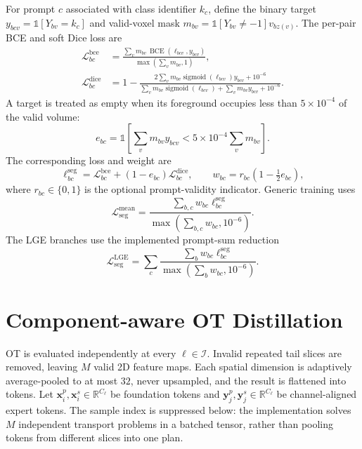 \documentclass[10pt]{article}
\newcommand{\R}{\mathbb{R}}
\newcommand{\one}{\mathbb{1}}
\newcommand{\cL}{\mathcal{L}}
\newcommand{\BCE}{\operatorname{BCE}}
\newcommand{\sigm}{\operatorname{sigmoid}}
\begin{document}
For prompt $c$ associated with class identifier $k_c$, define the binary target
$y_{bcv}=\one[Y_{bv}=k_c]$ and valid-voxel mask
$m_{bv}=\one[Y_{bv}\neq-1]v_{bz(v)}$.  The per-pair BCE and soft Dice loss are
\begin{align}
    \cL^{\mathrm{bce}}_{bc}
    &=\frac{\sum_v m_{bv}\,
       \BCE(\ell_{bcv},y_{bcv})}
       {\max(\sum_v m_{bv},1)},\\
    \cL^{\mathrm{dice}}_{bc}
    &=1-\frac{
       2\sum_v m_{bv}\sigm(\ell_{bcv})y_{bcv}+10^{-6}}
       {\sum_v m_{bv}\sigm(\ell_{bcv})+
        \sum_v m_{bv}y_{bcv}+10^{-6}}.
\end{align}
A target is treated as empty when its foreground occupies less than
$5\times10^{-4}$ of the valid volume:
\begin{equation}
    e_{bc}
    =\one\!\left[
       \sum_vm_{bv}y_{bcv}<5\times10^{-4}\sum_vm_{bv}
      \right].
\end{equation}
The corresponding loss and weight are
\begin{equation}
    \ell^{\mathrm{seg}}_{bc}
      =\cL^{\mathrm{bce}}_{bc}
       +(1-e_{bc})\cL^{\mathrm{dice}}_{bc},
    \qquad
    w_{bc}=r_{bc}\left(1-\tfrac12 e_{bc}\right),
    \label{eq:pair-seg}
\end{equation}
where $r_{bc}\in\{0,1\}$ is the optional prompt-validity indicator.  Generic
training uses
\begin{equation}
    \cL_{\mathrm{seg}}^{\mathrm{mean}}
    =\frac{\sum_{b,c}w_{bc}\ell^{\mathrm{seg}}_{bc}}
           {\max(\sum_{b,c}w_{bc},10^{-6})}.
    \label{eq:seg-mean}
\end{equation}
The LGE branches use the implemented prompt-sum reduction
\begin{equation}
    \cL_{\mathrm{seg}}^{\mathrm{LGE}}
    =\sum_c
      \frac{\sum_bw_{bc}\ell^{\mathrm{seg}}_{bc}}
           {\max(\sum_bw_{bc},10^{-6})}.
    \label{eq:seg-lge}
\end{equation}

\section{Component-aware OT Distillation}


OT is evaluated independently at every $\ell\in\mathcal{I}$.  Invalid repeated
tail slices are removed, leaving $M$ valid 2D feature maps.  Each spatial
dimension is adaptively average-pooled to at most $32$, never upsampled, and the
result is flattened into tokens.  Let
$\bm{x}^{p}_i,\bm{x}^{s}_i\in\R^{C_\ell}$ be foundation tokens and
$\bm{y}^{p}_j,\bm{y}^{s}_j\in\R^{C_\ell}$ be channel-aligned expert tokens.
The sample index is suppressed below: the implementation solves $M$ independent
transport problems in a batched tensor, rather than pooling tokens from different
slices into one plan.
\end{document}
